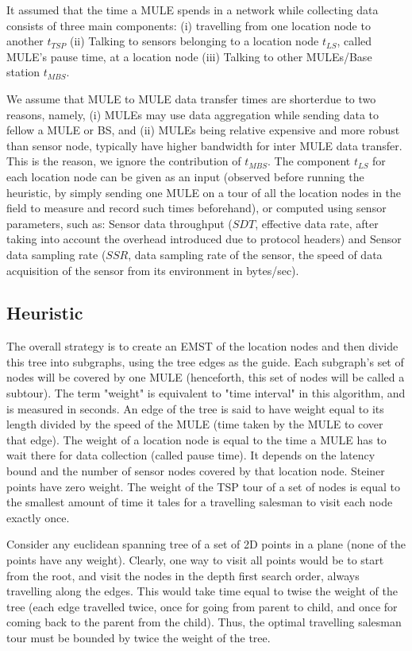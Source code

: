 It assumed that the time a MULE spends in a network while collecting data
consists of three main components: (i) travelling from one location node to another $t_{TSP}$ (ii) Talking to sensors belonging to a location node $t_{LS}$, called MULE's pause time, at a location node (iii) Talking to other MULEs/Base station $t_{MBS}$.

We assume that MULE to MULE data transfer times are shorterdue to two reasons, namely, (i) MULEs may use data aggregation while sending data to fellow a MULE or BS, and (ii) MULEs being relative expensive and more robust than sensor node, typically have higher bandwidth for inter MULE data transfer. This is the reason, we ignore the contribution of $t_{MBS}$. The component $t_{LS}$ for each location node can be given as an input (observed before running the heuristic, by simply sending one MULE on a tour of all the location nodes in the field to measure and record such times beforehand), or computed using sensor parameters, such as: Sensor data throughput ($SDT$, effective data rate, after taking into account the overhead introduced due to protocol headers) and Sensor data sampling rate ($SSR$, data sampling rate of the sensor, the speed of data acquisition of the sensor from its environment in bytes/sec).


\subsection{Heuristic}

The overall strategy is to create an EMST of the location nodes and then divide this tree into subgraphs, using the tree edges as the guide. Each subgraph's set of nodes will be covered by one MULE (henceforth, this set of nodes will be called a subtour). The term "weight" is equivalent to "time interval" in this algorithm, and is measured in seconds. An edge of the tree is said to have weight equal to its length divided by the speed of the MULE (time taken by the MULE to cover that edge). The weight of a location node is equal to the time a MULE has to wait there for data collection (called pause time). It depends on the latency bound and the number of sensor nodes covered by that location node. Steiner points have zero weight. The weight of the TSP tour of a set of nodes is equal to the smallest amount of time it tales for a travelling salesman to visit each node exactly once.

Consider any euclidean spanning tree of a set of 2D points in a plane (none of the points have any weight). Clearly, one way to visit all points would be to start from the root, and visit the nodes in the depth first search order, always travelling along the edges. This would take time equal to twise the weight of the tree (each edge travelled twice, once for going from parent to child, and once for coming back to the parent from the child). Thus, the optimal travelling salesman tour must be bounded by twice the weight of the tree. 

